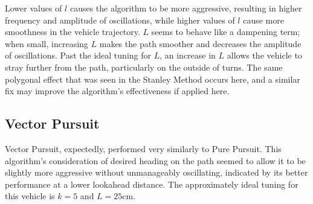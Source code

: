 \documentclass[mla8alt]{mla}
\begin{document}
\begin{paper}
\begin{figure}[H]
\endminipage
\end{figure}

Lower values of $l$ causes the algorithm to be more aggressive, resulting in higher frequency and amplitude of oscillations, while higher values of $l$ cause more smoothness in the vehicle trajectory. $L$ seems to behave like a dampening term; when small, increasing $L$ makes the path smoother and decreases the amplitude of oscillations. Past the ideal tuning for $L$, an increase in $L$ allows the vehicle to stray further from the path, particularly on the outside of turns. The same polygonal effect that was seen in the Stanley Method occurs here, and a similar fix may improve the algorithm's effectiveness if applied here.

\subsection{Vector Pursuit}

Vector Pursuit, expectedly, performed very similarly to Pure Pursuit. This algorithm's consideration of desired heading on the path seemed to allow it to be slightly more aggressive without unmanageably oscillating, indicated by its better performance at a lower lookahead distance. The approximately ideal tuning for this vehicle is $k=5$ and $L=25$cm. 



\end{paper}
\end{document}
